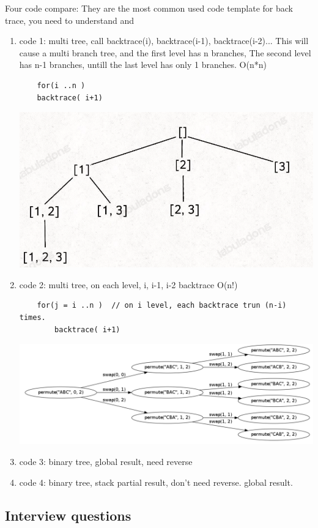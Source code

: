 \documentclass[a4paper,11pt,twoside]{book}
\begin{document}
	\par Four code compare: They are the most common used code template for back trace, you need to understand and 
\begin{enumerate}
	\item code 1: multi tree, call backtrace(i),  backtrace(i-1), backtrace(i-2)... This will cause a multi branch tree, and the first level has n branches, The second level has n-1 branches, untill the last level has only 1 branches.   O(n*n)
\begin{lstlisting}
	for(i ..n )
	backtrace( i+1)
\end{lstlisting}
	
	\begin{center}
		\includegraphics[width=0.5\linewidth]{pics/sub}
	\end{center}
	
	\item code 2: multi tree, on each level,  i, i-1,  i-2 backtrace O(n!)
\begin{lstlisting}
	for(j = i ..n )  // on i level, each backtrace trun (n-i) times. 
		backtrace( i+1)
\end{lstlisting}

	\includegraphics[scale=0.25]{pics/permutation.png}

	\item code 3: binary tree, global result, need reverse
	
	\item code 4: binary tree, stack partial result, don't need reverse. global result.
\end{enumerate}


\subsection{Interview questions}
\end{document}
